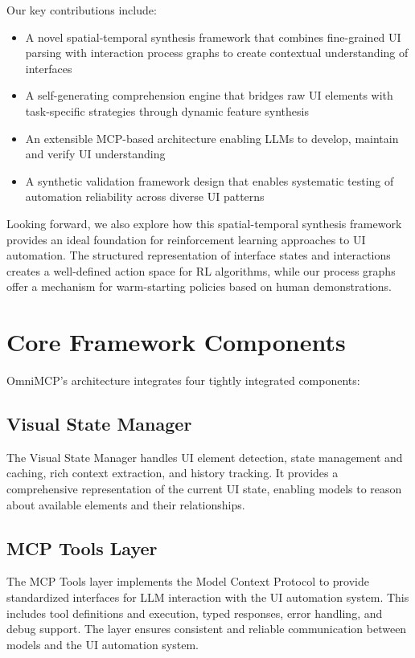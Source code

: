 \documentclass{article}
\begin{document}
Our key contributions include:
\begin{itemize}
    \item A novel spatial-temporal synthesis framework that combines fine-grained UI parsing with interaction process graphs to create contextual understanding of interfaces
    \item A self-generating comprehension engine that bridges raw UI elements with task-specific strategies through dynamic feature synthesis
    \item An extensible MCP-based architecture enabling LLMs to develop, maintain and verify UI understanding
    \item A synthetic validation framework design that enables systematic testing of automation reliability across diverse UI patterns
\end{itemize}

Looking forward, we also explore how this spatial-temporal synthesis framework provides an ideal foundation for reinforcement learning approaches to UI automation. The structured representation of interface states and interactions creates a well-defined action space for RL algorithms, while our process graphs offer a mechanism for warm-starting policies based on human demonstrations.

\section{Core Framework Components}

OmniMCP's architecture integrates four tightly integrated components:

\subsection{Visual State Manager}
The Visual State Manager handles UI element detection, state management and caching, rich context extraction, and history tracking. It provides a comprehensive representation of the current UI state, enabling models to reason about available elements and their relationships.

\subsection{MCP Tools Layer}
The MCP Tools layer implements the Model Context Protocol to provide standardized interfaces for LLM interaction with the UI automation system. This includes tool definitions and execution, typed responses, error handling, and debug support. The layer ensures consistent and reliable communication between models and the UI automation system.
\end{document}
